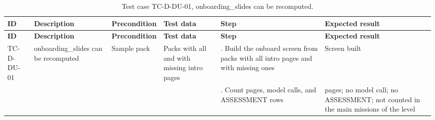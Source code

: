 {\footnotesize{}\renewcommand{\arraystretch}{1.1}
\begin{longtable}{|>{\raggedright\arraybackslash}p{}|>{\raggedright\arraybackslash}p{}|>{\raggedright\arraybackslash}p{}|>{\raggedright\arraybackslash}p{}|>{\raggedright\arraybackslash}p{}|>{\raggedright\arraybackslash}p{}|}
\caption{Test case TC-D-DU-01, onboarding\_\allowbreak{}slides can be recomputed.} \\
\hline
\textbf{ID} & \textbf{Description} & \textbf{Precondition} & \textbf{Test data} & \textbf{Step} & \textbf{Expected result} \\ \hline
\endfirsthead
\hline
\textbf{ID} & \textbf{Description} & \textbf{Precondition} & \textbf{Test data} & \textbf{Step} & \textbf{Expected result} \\ \hline
\endhead
TC-D-DU-01 & onboarding\_\allowbreak{}slides can be recomputed & Sample pack & Packs with all and with missing intro pages & 1. Build the onboard screen from packs with all intro pages and with missing ones & Screen built \\ \cline{5-6}
 &  &  &  & 2. Count pages, model calls, and ASSESSMENT rows & 6 pages; no model call; no ASSESSMENT; not counted in the main missions of the level \\ \hline
\end{longtable}
}

